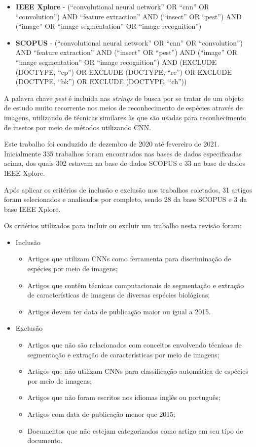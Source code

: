 \documentclass[
	12pt,				%
	oneside,			%
	a4paper,			%
	english,			%
	brazil				%
	]{abntex2ppgsi}
\begin{document}
\begin{itemize}
  \item \textbf{IEEE Xplore} - (``convolutional neural network'' OR ``cnn'' OR ``convolution'') AND ``feature extraction'' AND (``insect'' OR ``pest'') AND (``image'' OR ``image segmentation'' OR ``image recognition'')
  \item \textbf{SCOPUS} - (``convolutional neural network'' OR ``cnn'' OR ``convolution'') AND ``feature extraction'' AND (``insect'' OR ``pest'') AND (``image'' OR ``image segmentation'' OR ``image recognition'') AND (EXCLUDE (DOCTYPE, ``cp'') OR EXCLUDE (DOCTYPE, ``re'') OR EXCLUDE (DOCTYPE, ``bk'') OR EXCLUDE (DOCTYPE, ``ch''))
\end{itemize}

A palavra chave \textit{pest} é incluída nas \textit{strings} de busca por se tratar de um objeto de estudo muito recorrente nos meios de reconhecimento de espécies através de imagens, utilizando de técnicas similares às que são usadas para reconhecimento de insetos por meio de métodos utilizando CNN.

Este trabalho foi conduzido de dezembro de 2020 até fevereiro de 2021. Inicialmente 335 trabalhos foram encontrados nas bases de dados especificadas acima, dos quais 302 estavam na base de dados SCOPUS e 33 na base de dados IEEE Xplore.

Após aplicar os critérios de inclusão e exclusão nos trabalhos coletados, 31 artigos foram selecionados e analisados por completo, sendo 28 da base SCOPUS e 3 da base IEEE Xplore.

Os critérios utilizados para incluir ou excluir um trabalho nesta revisão foram:

\begin{itemize}
  \item Inclusão
    \begin{itemize}
        \item{Artigos que utilizam CNNs como ferramenta para discriminação de espécies por meio de imagens;}
        \item{Artigos que contêm técnicas computacionais de segmentação e extração de características de imagens de diversas espécies biológicas;}
        \item{Artigos devem ter data de publicação maior ou igual a 2015.}
    \end{itemize}
  \item Exclusão
    \begin{itemize}
        \item{Artigos que não são relacionados com conceitos envolvendo técnicas de segmentação e extração de características por meio de imagens;}
        \item{Artigos que não utilizam CNNs para classificação automática de espécies por meio de imagens;}
        \item{Artigos que não foram escritos nos idiomas inglês ou português;}
        \item{Artigos com data de publicação menor que 2015;}
        \item{Documentos que não estejam categorizados como artigo em seu tipo de documento.}
    \end{itemize}
\end{itemize}
\end{document}

